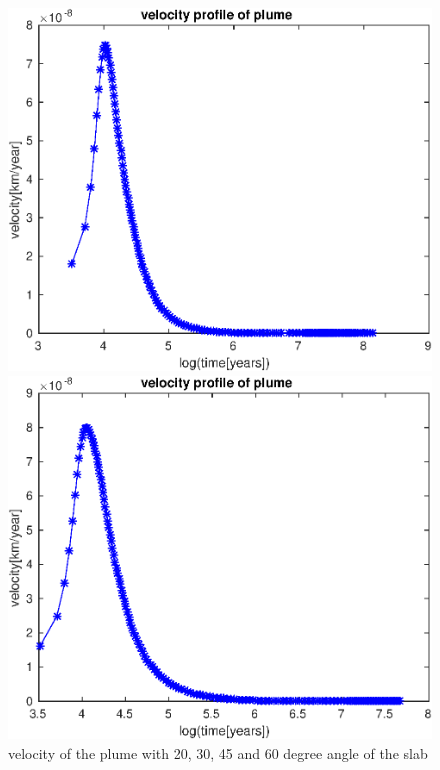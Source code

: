 \documentclass[12pt]{scrartcl}
\begin{document}
\begin{figure}
\begin{minipage}[t]{1.0\textwidth}
\begin{minipage}[t]{0.5\textwidth}
		\end{minipage}
	\end{minipage}
	\begin{minipage}[t]{1.0\textwidth}	
		\begin{minipage}[t]{0.5\textwidth}
		\includegraphics[width=1.0\textwidth]{./Snapshots/ref/Subductionzonewithblobposrefslab45s2e7s2e7r20velocity.eps}
		\end{minipage}
		\begin{minipage}[t]{0.5\textwidth}
		\includegraphics[width=1.0\textwidth]{./Snapshots/ref/Subductionzonewithblobposrefslab60s2e7s2e7r20velocity.eps}
		\end{minipage}
	\end{minipage}
	\caption{velocity of the plume with 20, 30, 45 and 60 degree angle of the slab}
\end{figure}
\end{document}
